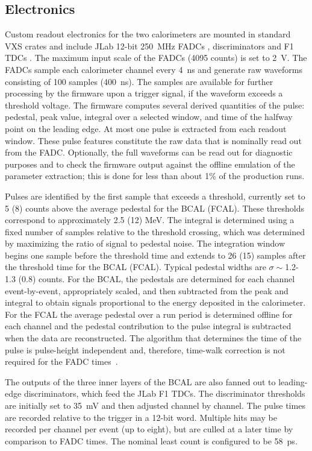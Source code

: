 \subsection{Electronics \label{sec:calelectronics}}
Custom readout electronics for the two calorimeters are mounted in standard VXS crates and include 
JLab 12-bit 250~MHz FADCs \cite{hdnote1022}, discriminators \cite{hdnote2511} and F1 TDCs \cite{hdnote1021}. The maximum input scale of the FADCs (4095 counts) is set to 2~V.
The FADCs sample each calorimeter channel every 4~ns and generate raw waveforms consisting of 100 samples 
 (400~ns). The samples are available for further processing by the firmware upon a trigger signal, if the waveform exceeds a threshold voltage. The firmware computes several derived quantities of the pulse: pedestal, peak value, integral over a selected window, and time of the halfway point on the leading edge. At most one pulse is extracted from each readout window. These pulse features constitute the raw data that is nominally read out from the FADC.  Optionally, the full waveforms can be read out for diagnostic purposes and to check the firmware output against the offline emulation of the parameter extraction; this is done for less than about 1\% of the production runs.
 
Pulses are identified by the first sample that exceeds a threshold, currently set to 5 (8) counts above the average pedestal for the BCAL (FCAL). These thresholds correspond to approximately 2.5 (12) MeV. The integral is determined using a fixed number of samples relative to the threshold crossing, which was determined by maximizing the ratio of signal to pedestal noise.  The integration window begins one sample before the threshold time and extends to 26 (15) samples after the threshold time for the BCAL (FCAL).  Typical pedestal widths are $\sigma\sim$1.2-1.3 (0.8) counts. For the BCAL, the pedestals are determined for each channel event-by-event, appropriately scaled, and then subtracted from the peak and integral to obtain signals proportional to the energy deposited in the calorimeter. For the FCAL the average pedestal over a run period is determined offline for each channel and the pedestal contribution to the pulse integral is subtracted when the data are reconstructed.  %
 The algorithm that determines the time of the pulse is pulse-height independent and, therefore, time-walk correction is not required for the FADC times~\cite{Bennett:2010nf}.

The outputs of the three inner layers of the BCAL are also fanned out to leading-edge discriminators, which feed the JLab F1 TDCs. The discriminator thresholds are initially set to 35~mV and then adjusted
 channel by channel.  The pulse times are recorded relative to the trigger in a 12-bit word. Multiple hits may be recorded per channel per event (up to eight), but are culled at a later time by comparison to FADC times. The nominal least count is configured to be 58~ps.


